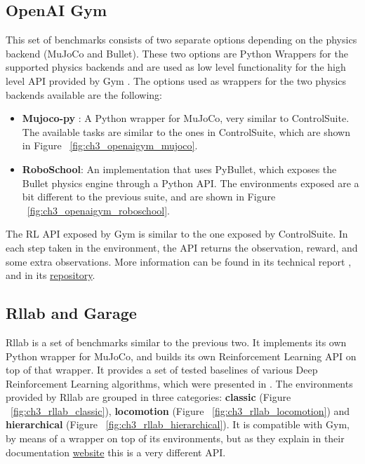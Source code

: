 \subsection{OpenAI Gym}

This set of benchmarks consists of two separate options depending on the physics 
backend (MuJoCo and Bullet). These two options are Python Wrappers for the supported 
physics backends and are used as low level functionality for the high level API provided by Gym \citep{Gym}.
The options used as wrappers for the two physics backends available are the following:

\begin{itemize}
    \item \textbf{Mujoco-py} : A Python wrapper for MuJoCo, very similar to ControlSuite. 
          The available tasks are similar to the ones in ControlSuite, which are shown 
          in Figure ~\ref{fig:ch3_openaigym_mujoco}.

        \figBenchmarkOpenAIGymMujoco

    \item \textbf{RoboSchool}: An implementation that uses PyBullet, which exposes 
          the Bullet physics engine through a Python API. The environments exposed 
          are a bit different to the previous suite, and are shown in Figure ~\ref{fig:ch3_openaigym_roboschool}. 

        \figBenchmarkOpenAIGymRoboschool

\end{itemize}

The RL API exposed by Gym is similar to the one exposed by ControlSuite. 
In each step taken in the environment, the API returns the observation, 
reward, and some extra observations. More information can be found in its 
technical report \citep{Gym}, and in its \href{https://github.com/openai/gym}{repository}.

\subsection{Rllab and Garage}

Rllab is a set of benchmarks similar to the previous two. It implements its own 
Python wrapper for MuJoCo, and builds its own Reinforcement Learning API on top 
of that wrapper. It provides a set of tested baselines of various Deep Reinforcement 
Learning algorithms, which were presented in \cite{Rllab}. The environments provided 
by Rllab are grouped in three categories: \textbf{classic} (Figure ~\ref{fig:ch3_rllab_classic}), 
\textbf{locomotion} (Figure ~\ref{fig:ch3_rllab_locomotion}) and \textbf{hierarchical} 
(Figure ~\ref{fig:ch3_rllab_hierarchical}). It is compatible with Gym, by means of 
a wrapper on top of its environments, but as they explain in their documentation 
\href{https://rllab.readthedocs.io/en/latest/user/gym_integration.html}{website} 
this is a very different API.

